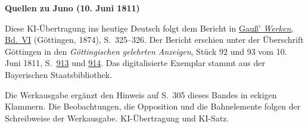 \clearpage\thispagestyle{empty}
\begin{center}\textbf{Quellen zu Juno (10. Juni 1811)}\end{center}
\noindent Diese KI-Übertragung ins heutige Deutsch folgt dem Bericht in \href{https://gdz.sub.uni-goettingen.de/id/PPN236007467}{Gauß’ \textit{Werken}, Bd.~VI} (Göttingen, 1874), S.~325--326. Der Bericht erschien unter der Überschrift Göttingen in den \textit{Göttingischen gelehrten Anzeigen}, Stück 92 und 93 vom 10. Juni 1811, S.~\href{https://api.digitale-sammlungen.de/iiif/image/v2/bsb10538679_00949/full/1600,/0/default.jpg}{913} und \href{https://api.digitale-sammlungen.de/iiif/image/v2/bsb10538679_00950/full/1600,/0/default.jpg}{914}. Das digitalisierte Exemplar stammt aus der Bayerischen Staatsbibliothek.
\par\smallskip\noindent Die Werkausgabe ergänzt den Hinweis auf S.~305 dieses Bandes in eckigen Klammern. Die Beobachtungen, die Opposition und die Bahnelemente folgen der Schreibweise der Werkausgabe. KI-Übertragung und KI-Satz.
\clearpage

